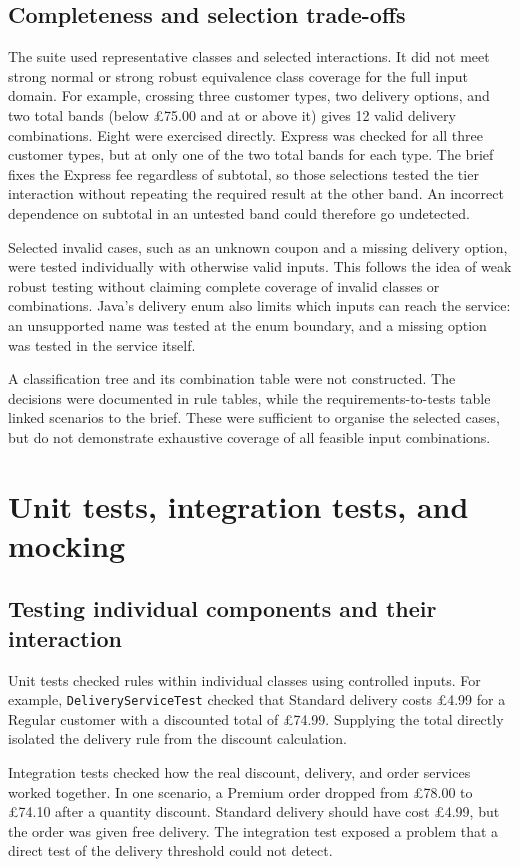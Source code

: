 \subsection{Completeness and selection trade-offs}
The suite used representative classes and selected interactions. It did
not meet strong normal or strong robust equivalence class coverage for
the full input domain. For example, crossing three customer types, two
delivery options, and two total bands (below \pounds75.00 and at or above
it) gives 12 valid delivery combinations. Eight were exercised directly.
Express was checked for all three customer types, but at only one of the
two total bands for each type. The brief fixes the Express fee regardless
of subtotal, so those selections tested the tier interaction without
repeating the required result at the other band. An incorrect dependence
on subtotal in an untested band could therefore go undetected.

Selected invalid cases, such as an unknown coupon and a missing delivery
option, were tested individually with otherwise valid inputs. This
follows the idea of weak robust testing without claiming complete
coverage of invalid classes or combinations. Java's delivery enum also
limits which inputs can reach the service: an unsupported name was
tested at the enum boundary, and a missing option was tested in the
service itself.

A classification tree and its combination table were not constructed.
The decisions were documented in rule tables, while the
requirements-to-tests table linked scenarios to the brief. These were
sufficient to organise the selected cases, but do not demonstrate
exhaustive coverage of all feasible input combinations.

\section{Unit tests, integration tests, and mocking}
\subsection{Testing individual components and their interaction}
Unit tests checked rules within individual classes using controlled
inputs. For example, \texttt{DeliveryServiceTest} checked that Standard
delivery costs \pounds4.99 for a Regular customer with a discounted
total of \pounds74.99. Supplying the total directly isolated the
delivery rule from the discount calculation.

Integration tests checked how the real discount, delivery, and order
services worked together. In one scenario, a Premium order dropped from
\pounds78.00 to \pounds74.10 after a quantity discount. Standard delivery
should have cost \pounds4.99, but the order was given free delivery.
The integration test exposed a problem that a direct test of the
delivery threshold could not detect.

